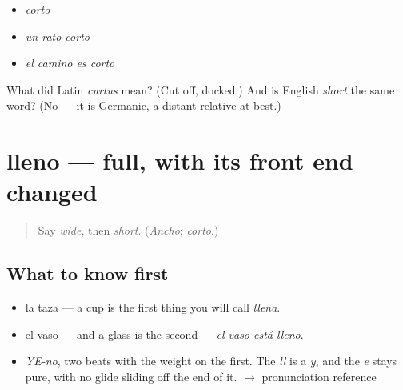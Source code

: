 \begin{itemize}
\raggedright
  \item \emph{corto}
  \item \emph{un rato corto}
  \item \emph{el camino es corto}
\end{itemize}

\begin{tcolorbox}[breakable,colback=teal!4,colframe=teal!35!black,title={Before you move on}]
What did Latin \emph{curtus} mean? (Cut off, docked.) And is English \emph{short} the same word? (No — it is Germanic, a distant relative at best.)
\end{tcolorbox}
\section[lleno]{lleno — full, with its front end changed}

\label{lesson:ES-C365-lleno}



\begin{quote}
Say \emph{wide}, then \emph{short}. (\emph{Ancho}; \emph{corto}.)
\end{quote}

\subsection*{What to know first}
\begin{itemize}
\raggedright
  \item la taza — a cup is the first thing you will call \emph{llena}.
  \item el vaso — and a glass is the second — \emph{el vaso está lleno}.
\end{itemize}

\begin{sounds}
\begin{itemize}
\raggedright
  \item \emph{YE-no}, two beats with the weight on the first. The \emph{ll} is a \emph{y}, and the \emph{e} stays pure, with no glide sliding off the end of it. $\to$ pronunciation reference
\end{itemize}
\end{sounds}

